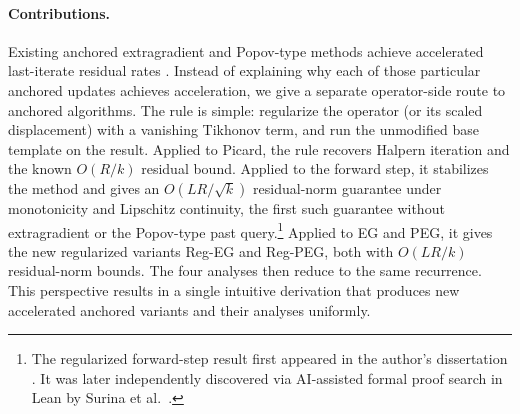 \documentclass[letterpaper,11pt]{article}
\begin{document}
\paragraph{Contributions.}
Existing anchored extragradient and Popov-type methods achieve accelerated
last-iterate residual rates
\cite{yoon2021accelerated,lee2021fast,boct2024extra,tran2021halpern,bot2025fast}. Instead of explaining why each of those particular anchored
updates achieves acceleration, we give a separate
operator-side route to anchored algorithms. The rule is simple: regularize the
operator (or its scaled displacement) with a vanishing Tikhonov term, and run
the unmodified base template on the result. Applied to Picard, the rule
recovers Halpern iteration and the known \(O(R/k)\) residual bound. Applied
to the forward step, it stabilizes the method and gives an
\(O(LR/\sqrt{k})\) residual-norm guarantee under monotonicity and Lipschitz
continuity, the first such guarantee without extragradient or the Popov-type
past query.\footnote{The regularized forward-step result first appeared in the
author's dissertation \cite{chen2025algorithmic}. It was later independently
discovered via AI-assisted formal proof search in Lean by Surina et
al.~\cite{surina2026improved}.} Applied to EG and
PEG, it gives the new regularized variants Reg-EG and Reg-PEG, both with
\(O(LR/k)\) residual-norm bounds. The four analyses then
reduce to the same recurrence. This perspective results in a single intuitive derivation that
produces new accelerated anchored variants and their analyses uniformly.
\end{document}
